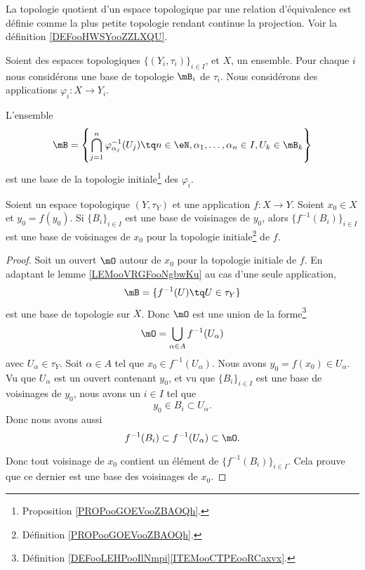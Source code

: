 La topologie quotient d'un espace topologique par une relation d'équivalence est définie comme la plus petite topologie rendant continue la projection. Voir la définition \ref{DEFooHWSYooZZLXQU}.

\begin{lemma}     \label{LEMooVRGFooNgbwKu}
	Soient des espaces topologiques \( \{ (Y_i,\tau_i) \}_{i\in I}\), et \( X\), un ensemble. Pour chaque \( i\) nous considérons une base de topologie \( \mB_i\) de \( \tau_i\). Nous considérons des applications \( \varphi_i\colon X\to Y_i\).

	L'ensemble
	\begin{equation}
		\mB=\left\{ \bigcap_{j=1}^n \varphi^{-1}_{\alpha_j}(U_j)\tq n\in \eN,\alpha_1,\ldots,\alpha_n\in I,U_k\in \mB_k \right\}
	\end{equation}
	est une base de la topologie initiale\footnote{Proposition \ref{PROPooGOEVooZBAOQh}.} des \( \varphi_i\).
\end{lemma}


\begin{proposition}		\label{PROPooOPJCooAIUXCW}
	Soient un espace topologique \( (Y,\tau_Y)\) et une application \(f \colon X\to Y  \). Soient \( x_0\in X\) et \( y_0=f(y_0)\). Si \( \{ B_i \}_{i\in I}\) est une base de voisinages de \( y_0\), alors \( \{ f^{-1}(B_i) \}_{i\in I}\) est une base de voisinages de \( x_0\) pour la topologie initiale\footnote{Définition \ref{PROPooGOEVooZBAOQh}.} de \( f\).
\end{proposition}

\begin{proof}
	Soit un ouvert \( \mO\) autour de \( x_0\) pour la topologie initiale de \( f\). En adaptant le lemme \ref{LEMooVRGFooNgbwKu} au cas d'une seule application,
	\begin{equation}
		\mB=\{ f^{-1}(U)\tq U\in \tau_Y \}
	\end{equation}
	est une base de topologie sur \( X\). Donc \( \mO\) est une union de la forme\footnote{Définition \ref{DEFooLEHPooIlNmpi}\ref{ITEMooCTPEooRCaxvx}.}
	\begin{equation}
		\mO=\bigcup_{\alpha\in A}f^{-1}(U_{\alpha})
	\end{equation}
	avec \( U_{\alpha}\in \tau_Y\). Soit \( \alpha\in A\) tel que \( x_0\in f^{-1}(U_{\alpha})\). Nous avons \( y_0=f(x_0)\in U_{\alpha}\). Vu que \( U_{\alpha}\) est un ouvert contenant \( y_0\), et vu que \( \{ B_i \}_{i\in I}\) est une base de voisinages de \( y_0\), nous avons un \( i\in I\) tel que
	\begin{equation}
		y_0\in B_i\subset U_{\alpha}.
	\end{equation}
	Donc nous avons aussi
	\begin{equation}
		f^{-1}(B_i)\subset f^{-1}(U_{\alpha})\subset \mO.
	\end{equation}

	Donc tout voisinage de \( x_0\) contient un élément de \( \{ f^{-1}(B_i) \}_{i\in I}\). Cela prouve que ce dernier est une base des voisinages de \( x_0\).
\end{proof}

